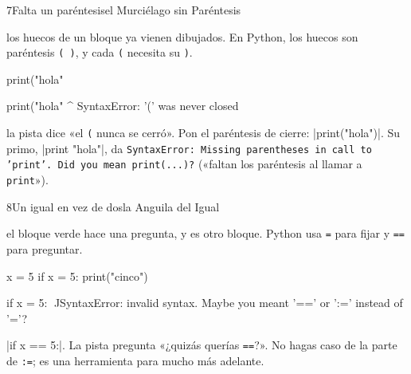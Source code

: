 \begin{bzcard}{7}{Falta un paréntesis}{el Murciélago sin Paréntesis}
\noindent\begin{minipage}[c]{0.43\linewidth}
 los huecos de un bloque ya vienen dibujados. En Python, los huecos son paréntesis \texttt{( )}, y cada \texttt{(} necesita su \texttt{)}.
\end{minipage}\hfill
\begin{minipage}[c]{0.54\linewidth}
\begin{bzsnip}
print("hola"
\end{bzsnip}
\end{minipage}\par
\begin{bzerror}
    print("hola"
         ^
SyntaxError: '(' was never closed
\end{bzerror}
 la pista dice «el \texttt{(} nunca se cerró». Pon el paréntesis de cierre: \py|print("hola")|. Su primo, \py|print "hola"|, da \texttt{SyntaxError: Missing parentheses in call to 'print'. Did you mean print(...)?} («faltan los paréntesis al llamar a \texttt{print}»).
\end{bzcard}

\begin{bzcard}{8}{Un igual en vez de dos}{la Anguila del Igual}
\noindent\begin{minipage}[c]{0.43\linewidth}
 el bloque verde \chip[operators]{( ) = ( )} hace una pregunta, y  es otro bloque. Python usa \texttt{=} para fijar y \texttt{==} para preguntar.
\end{minipage}\hfill
\begin{minipage}[c]{0.54\linewidth}
\begin{bzsnip}
x = 5
if x = 5:
    print("cinco")
\end{bzsnip}
\end{minipage}\par
\begin{bzerror}
    if x = 5:
       ^^^^^
SyntaxError: invalid syntax. Maybe you meant '==' or ':=' instead of '='?
\end{bzerror}
 \py|if x == 5:|. La pista pregunta «¿quizás querías \texttt{==}?». No hagas caso de la parte de \texttt{:=}; es una herramienta para mucho más adelante.
\end{bzcard}

